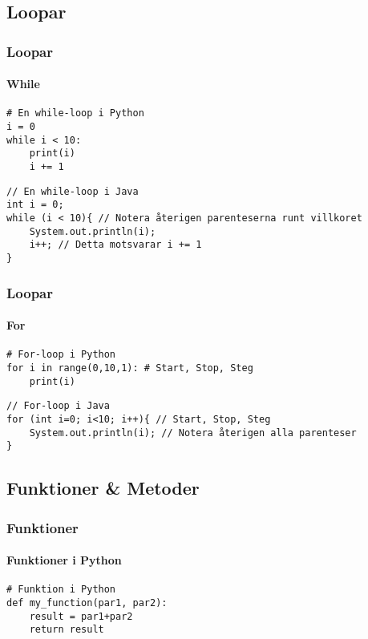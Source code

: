 \documentclass[aspectratio=169]{beamer}
\begin{document}
\subsection{Loopar}

\begin{frame}[fragile]
    \frametitle{Loopar}
    \framesubtitle{While}

    \begin{lstlisting}[style=python]
# En while-loop i Python
i = 0
while i < 10:
    print(i)
    i += 1
    \end{lstlisting}

    \begin{lstlisting}[style=java]
// En while-loop i Java
int i = 0;
while (i < 10){ // Notera återigen parenteserna runt villkoret
    System.out.println(i);
    i++; // Detta motsvarar i += 1
}
    \end{lstlisting}

\end{frame}

\begin{frame}[fragile]
    \frametitle{Loopar}
    \framesubtitle{For}

    \begin{lstlisting}[style=python]
# For-loop i Python
for i in range(0,10,1): # Start, Stop, Steg
    print(i)
    \end{lstlisting}

    \begin{lstlisting}[style=java]
// For-loop i Java
for (int i=0; i<10; i++){ // Start, Stop, Steg
    System.out.println(i); // Notera återigen alla parenteser
}
    \end{lstlisting}

\end{frame}

\subsection{Funktioner \& Metoder}

\begin{frame}[fragile]
    \frametitle{Funktioner}
    \framesubtitle{Funktioner i Python}

    \begin{lstlisting}[style=python]
# Funktion i Python
def my_function(par1, par2):
    result = par1+par2
    return result
    \end{lstlisting}

\end{frame}
\end{document}
